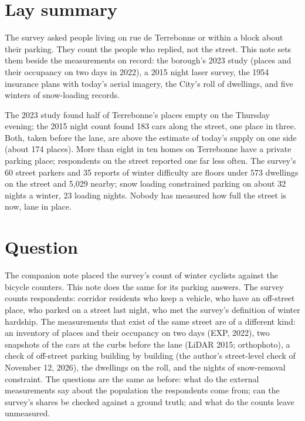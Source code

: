 \documentclass[11pt,a4paper]{article}
\begin{document}
\section*{Lay summary}
The survey asked people living on rue de Terrebonne or within a block about their parking. They count the people who replied, not the street. This note sets them beside the measurements on record: the borough\textquoteright{}s 2023 study (places and their occupancy on two days in 2022), a 2015 night laser survey, the 1954 insurance plans with today\textquoteright{}s aerial imagery, the City\textquoteright{}s roll of dwellings, and five winters of snow-loading records.

The 2023 study found half of Terrebonne\textquoteright{}s places empty on the Thursday evening; the 2015 night count found 183 cars along the street, one place in three. Both, taken before the lane, are above the estimate of today\textquoteright{}s supply on one side (about 174 places). More than eight in ten homes on Terrebonne have a private parking place; respondents on the street reported one far less often. The survey\textquoteright{}s 60 street parkers and 35 reports of winter difficulty are floors under 573 dwellings on the street and 5,029 nearby; snow loading constrained parking on about 32 nights a winter, 23 loading nights. Nobody has measured how full the street is now, lane in place.

\tableofcontents

\section{Question}
The companion note placed the survey\textquoteright{}s count of winter cyclists against the bicycle counters. This note does the same for its parking answers. The survey counts respondents: corridor residents who keep a vehicle, who have an off-street place, who parked on a street last night, who met the survey\textquoteright{}s definition of winter hardship. The measurements that exist of the same street are of a different kind: an inventory of places and their occupancy on two days (EXP, 2022), two snapshots of the cars at the curbs before the lane (LiDAR 2015; orthophoto), a check of off-street parking building by building (the author\textquoteright{}s street-level check of November 12, 2026), the dwellings on the roll, and the nights of snow-removal constraint. The questions are the same as before: what do the external measurements say about the population the respondents come from; can the survey\textquoteright{}s shares be checked against a ground truth; and what do the counts leave unmeasured.
\end{document}
